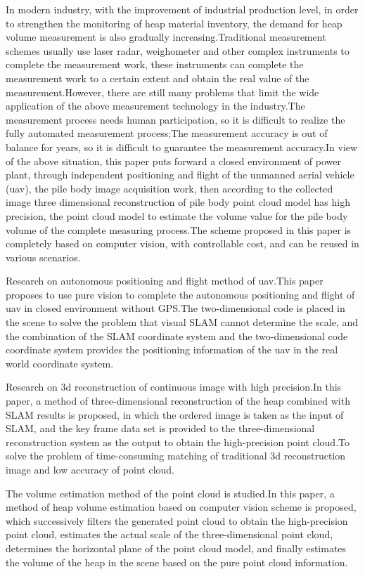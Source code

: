 \begin{eabstract}
  In modern industry, with the improvement of industrial production level, in order to strengthen the monitoring of heap material inventory, the demand for heap volume measurement is also gradually increasing.Traditional measurement schemes usually use laser radar, weighometer and other complex instruments to complete the measurement work, these instruments can complete the measurement work to a certain extent and obtain the real value of the measurement.However, there are still many problems that limit the wide application of the above measurement technology in the industry.The measurement process needs human participation, so it is difficult to realize the fully automated measurement process;The measurement accuracy is out of balance for years, so it is difficult to guarantee the measurement accuracy.In view of the above situation, this paper puts forward a closed environment of power plant, through independent positioning and flight of the unmanned aerial vehicle (uav), the pile body image acquisition work, then according to the collected image three dimensional reconstruction of pile body point cloud model has high precision, the point cloud model to estimate the volume value for the pile body volume of the complete measuring process.The scheme proposed in this paper is completely based on computer vision, with controllable cost, and can be reused in various scenarios.
  
  Research on autonomous positioning and flight method of uav.This paper proposes to use pure vision to complete the autonomous positioning and flight of uav in closed environment without GPS.The two-dimensional code is placed in the scene to solve the problem that visual SLAM cannot determine the scale, and the combination of the SLAM coordinate system and the two-dimensional code coordinate system provides the positioning information of the uav in the real world coordinate system.
  
  Research on 3d reconstruction of continuous image with high precision.In this paper, a method of three-dimensional reconstruction of the heap combined with SLAM results is proposed, in which the ordered image is taken as the input of SLAM, and the key frame data set is provided to the three-dimensional reconstruction system as the output to obtain the high-precision point cloud.To solve the problem of time-consuming matching of traditional 3d reconstruction image and low accuracy of point cloud.
  
  The volume estimation method of the point cloud is studied.In this paper, a method of heap volume estimation based on computer vision scheme is proposed, which successively filters the generated point cloud to obtain the high-precision point cloud, estimates the actual scale of the three-dimensional point cloud, determines the horizontal plane of the point cloud model, and finally estimates the volume of the heap in the scene based on the pure point cloud information.
  

\end{eabstract}
